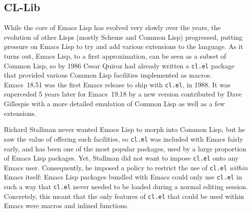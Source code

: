 \documentclass[format=acmsmall,screen]{acmart}
\newcommand \Elisp {Emacs Lisp}
\begin{document}
\subsection{CL-Lib}          %
\label{sec:cl-lib}

While the core of \Elisp{} has evolved very slowly over the years, the
evolution of other Lisps (mostly Scheme and Common Lisp) progressed,
putting pressure on \Elisp{} to
try and add various extensions to the language.  As it turns out, \Elisp{},
to a first approximation, can be seen as a subset of Common Lisp, so by
1986 Cesar Quiroz %
had already written
a \texttt{cl.el} package that provided various
Common Lisp facilities implemented as macros.  Emacs~18.51 was the
first Emacs release to ship with \texttt{cl.el}, in 1988.  It was superceded
5 years later for Emacs~19.18 by a new version contributed by Dave
Gillespie with a more detailed emulation of Common Lisp as well as a few
extensions.

Richard Stallman never wanted \Elisp{} to morph into Common Lisp, but he saw
the value of offering such facilities, so \texttt{cl.el} was
included with Emacs fairly early, and has been one of the most popular
packages, used by a large proportion of \Elisp{} packages.  Yet,
Stallman did
not want to impose \texttt{cl.el} onto any Emacs user. Consequently, he imposed
a policy to restrict the use of \texttt{cl.el} \emph{within} Emacs
itself: \Elisp{} packages bundled with Emacs 
could only use \texttt{cl.el} in such a way that
\texttt{cl.el} never needed to be loaded during a normal editing session.
Concretely, this meant that the only features of \texttt{cl.el} that could
be used within Emacs were macros and inlined functions.
\end{document}
